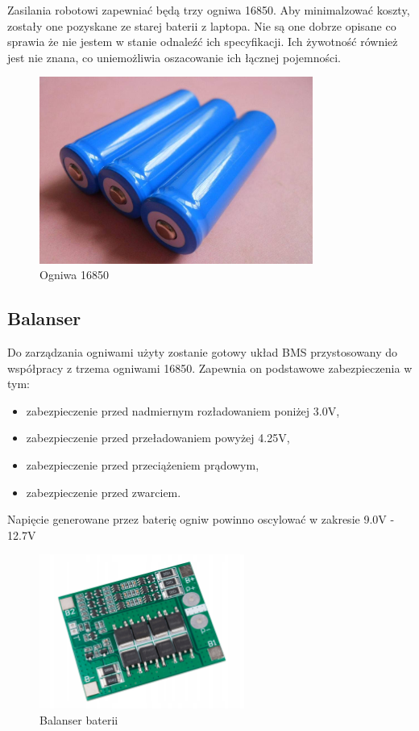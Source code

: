 \documentclass[10pt, a4paper]{article}
\begin{document}
Zasilania robotowi zapewniać będą trzy ogniwa 16850. 
Aby minimalzować koszty, zostały one pozyskane ze starej baterii z laptopa. 
Nie są one dobrze opisane co sprawia że nie jestem w stanie odnaleźć ich specyfikacji.
Ich żywotność również jest nie znana, co uniemożliwia oszacowanie ich łącznej pojemności.

\begin{figure}[H]
	\centering
	\includegraphics[width=0.8\textwidth]{figures/ogniwa.jpg}
	\caption{Ogniwa 16850}
	\label{fig:ogniwa}
\end{figure}



\subsection{Balanser}

Do zarządzania ogniwami użyty zostanie gotowy układ BMS przystosowany do współpracy z trzema ogniwami 16850. 
Zapewnia on podstawowe zabezpieczenia w tym:

\begin{itemize}
	\item zabezpieczenie przed nadmiernym rozładowaniem poniżej 3.0V,
	\item zabezpieczenie przed przeładowaniem powyżej 4.25V,
	\item zabezpieczenie przed przeciążeniem prądowym,
	\item zabezpieczenie przed zwarciem.
\end{itemize}

Napięcie generowane przez baterię ogniw powinno oscylować w zakresie 9.0V - 12.7V

\begin{figure}[H]
	\centering
	\includegraphics[width=0.6\textwidth]{figures/bms.jpg}
	\caption{Balanser baterii}
	\label{fig:bms}
\end{figure}
\end{document}

